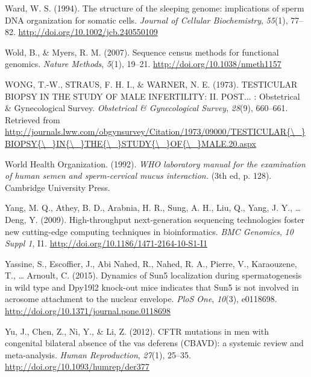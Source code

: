 \documentclass[12pt,twoside]{reedthesis}
\theoremstyle{definition}
\theoremstyle{definition}
\theoremstyle{remark}
\begin{document}
  \hypertarget{ref-Ward1994}{}
  Ward, W. S. (1994). The structure of the sleeping genome: implications
  of sperm DNA organization for somatic cells. \emph{Journal of Cellular
  Biochemistry}, \emph{55}(1), 77--82.
  \url{http://doi.org/10.1002/jcb.240550109}
  
  \hypertarget{ref-Wold2007}{}
  Wold, B., \& Myers, R. M. (2007). Sequence census methods for functional
  genomics. \emph{Nature Methods}, \emph{5}(1), 19--21.
  \url{http://doi.org/10.1038/nmeth1157}
  
  \hypertarget{ref-WONG1973}{}
  WONG, T.-W., STRAUS, F. H. I., \& WARNER, N. E. (1973). TESTICULAR
  BIOPSY IN THE STUDY OF MALE INFERTILITY: II. POST... : Obstetrical \&
  Gynecological Survey. \emph{Obstetrical \& Gynecological Survey},
  \emph{28}(9), 660--661. Retrieved from
  \href{http://journals.lww.com/obgynsurvey/Citation/1973/09000/TESTICULAR\%7B/_\%7DBIOPSY\%7B/_\%7DIN\%7B/_\%7DTHE\%7B/_\%7DSTUDY\%7B/_\%7DOF\%7B/_\%7DMALE.20.aspx}{http://journals.lww.com/obgynsurvey/Citation/1973/09000/TESTICULAR\{\textbackslash{}\_\}BIOPSY\{\textbackslash{}\_\}IN\{\textbackslash{}\_\}THE\{\textbackslash{}\_\}STUDY\{\textbackslash{}\_\}OF\{\textbackslash{}\_\}MALE.20.aspx}
  
  \hypertarget{ref-WorldHealthOrganization1992}{}
  World Health Organization. (1992). \emph{WHO laboratory manual for the
  examination of human semen and sperm-cervical mucus interaction.} (3th
  ed, p. 128). Cambridge University Press.
  
  \hypertarget{ref-Yang2009}{}
  Yang, M. Q., Athey, B. D., Arabnia, H. R., Sung, A. H., Liu, Q., Yang,
  J. Y., \ldots{} Deng, Y. (2009). High-throughput next-generation
  sequencing technologies foster new cutting-edge computing techniques in
  bioinformatics. \emph{BMC Genomics}, \emph{10 Suppl 1}, I1.
  \url{http://doi.org/10.1186/1471-2164-10-S1-I1}
  
  \hypertarget{ref-Yassine2015}{}
  Yassine, S., Escoffier, J., Abi Nahed, R., Nahed, R. A., Pierre, V.,
  Karaouzene, T., \ldots{} Arnoult, C. (2015). Dynamics of Sun5
  localization during spermatogenesis in wild type and Dpy19l2 knock-out
  mice indicates that Sun5 is not involved in acrosome attachment to the
  nuclear envelope. \emph{PloS One}, \emph{10}(3), e0118698.
  \url{http://doi.org/10.1371/journal.pone.0118698}
  
  \hypertarget{ref-Yu2012}{}
  Yu, J., Chen, Z., Ni, Y., \& Li, Z. (2012). CFTR mutations in men with
  congenital bilateral absence of the vas deferens (CBAVD): a systemic
  review and meta-analysis. \emph{Human Reproduction}, \emph{27}(1),
  25--35. \url{http://doi.org/10.1093/humrep/der377}
  
\end{document}
